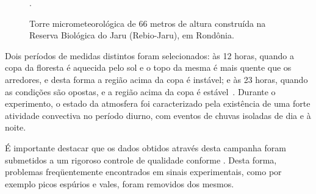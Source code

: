 \begin{figure}[ht]
	\caption{Torre micrometeorológica de $66$ metros de altura construída na Reserva Biológica do Jaru (Rebio-Jaru), em Rondônia.}
	\vspace{6mm}	%
	\begin{center}
	\end{center}
	\vspace{2mm}	%
	.
	\label{figtorre}
\end{figure}

Dois períodos de medidas distintos foram selecionados: às 12 horas, quando a copa da floresta é aquecida pelo sol e o topo da mesma é mais quente que os arredores, e desta forma a região acima da copa é instável; e às 23 horas, quando as condições são opostas, e a região acima da copa é estável~\cite{Ramos/04}. Durante o experimento, o estado da atmosfera foi caracterizado pela existência de uma forte atividade convectiva no período diurno, com eventos de chuvas isoladas de dia e à noite.

É importante destacar que os dados obtidos através desta campanha foram submetidos a um rigoroso controle de qualidade conforme . Desta forma, problemas freqüentemente encontrados em sinais experimentais, como por exemplo picos espúrios e vales, foram removidos dos mesmos.
